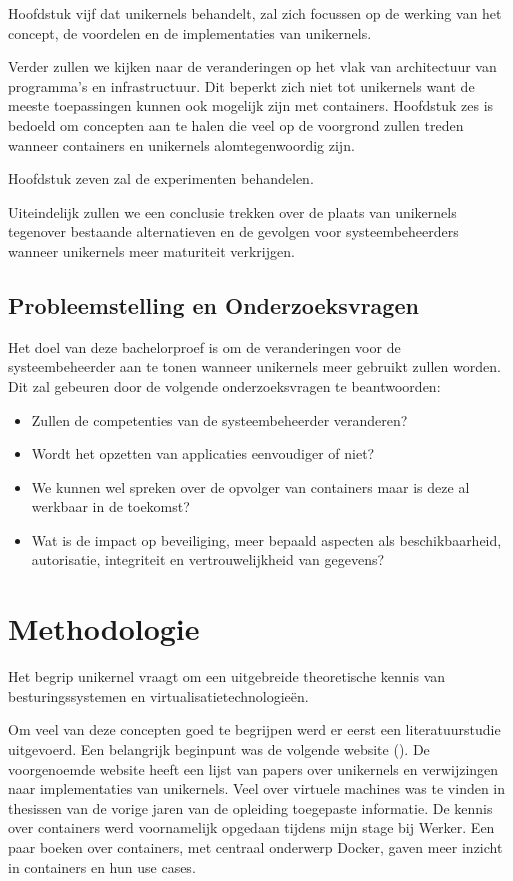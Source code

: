 \documentclass[pdftex,a4paper,12pt,twoside]{report}
\begin{document}
Hoofdstuk vijf dat unikernels behandelt, zal zich focussen op de werking van het concept, de voordelen en de implementaties van unikernels.

Verder zullen we kijken naar de veranderingen op het vlak van architectuur van programma's en infrastructuur. Dit beperkt zich niet tot unikernels want de meeste toepassingen kunnen ook mogelijk zijn met containers. Hoofdstuk zes is bedoeld om concepten aan te halen die veel op de voorgrond zullen treden wanneer containers en unikernels alomtegenwoordig zijn.

Hoofdstuk zeven zal de experimenten behandelen.

Uiteindelijk zullen we een conclusie trekken over de plaats van unikernels tegenover bestaande alternatieven en de gevolgen voor systeembeheerders wanneer unikernels meer maturiteit verkrijgen.

\section{Probleemstelling en Onderzoeksvragen}
\label{sec:onderzoeksvragen}

Het doel van deze bachelorproef is om de veranderingen voor de systeembeheerder aan te tonen wanneer unikernels meer gebruikt zullen worden.
Dit zal gebeuren door de volgende onderzoeksvragen te beantwoorden:

\begin{itemize}  
\item Zullen de competenties van de systeembeheerder veranderen?
\item Wordt het opzetten van applicaties eenvoudiger of niet?
\item We kunnen wel spreken over de opvolger van containers maar is deze al werkbaar in de toekomst?
\item Wat is de impact op beveiliging, meer bepaald aspecten als beschikbaarheid, autorisatie, integriteit en vertrouwelijkheid van gegevens?
\end{itemize}

\chapter{Methodologie}
\label{ch:methodologie}

Het begrip unikernel vraagt om een uitgebreide theoretische kennis van besturingssystemen en virtualisatietechnologieën.

Om veel van deze concepten goed te begrijpen werd er eerst een literatuurstudie uitgevoerd.
Een belangrijk beginpunt was de volgende website (\cite{unikernel_systems_unikernels_2016}). De voorgenoemde website heeft een lijst van papers over unikernels en verwijzingen naar implementaties van unikernels.
Veel over virtuele machines was te vinden in thesissen van de vorige jaren van de opleiding toegepaste informatie. De kennis over containers werd voornamelijk opgedaan tijdens mijn stage bij Werker. Een paar boeken over containers, met centraal onderwerp Docker, gaven meer inzicht in containers en hun use cases.
\end{document}
